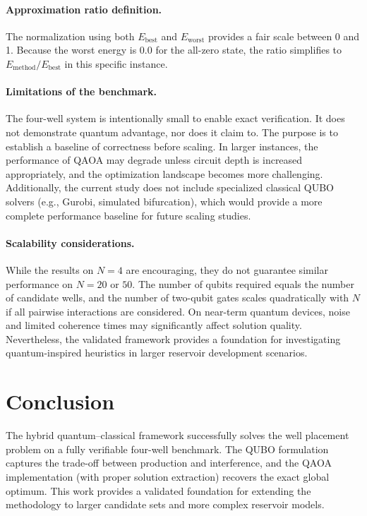 \documentclass[12pt]{article}
\begin{document}
\paragraph{Approximation ratio definition.}
The normalization using both \(E_{\text{best}}\) and \(E_{\text{worst}}\) provides a fair scale between 0 and 1. Because the worst energy is \(0.0\) for the all-zero state, the ratio simplifies to \(E_{\text{method}}/E_{\text{best}}\) in this specific instance.

\paragraph{Limitations of the benchmark.}
The four-well system is intentionally small to enable exact verification. It does not demonstrate quantum advantage, nor does it claim to. The purpose is to establish a baseline of correctness before scaling. In larger instances, the performance of QAOA may degrade unless circuit depth is increased appropriately, and the optimization landscape becomes more challenging. Additionally, the current study does not include specialized classical QUBO solvers (e.g., Gurobi, simulated bifurcation), which would provide a more complete performance baseline for future scaling studies.

\paragraph{Scalability considerations.}
While the results on \(N=4\) are encouraging, they do not guarantee similar performance on \(N=20\) or \(50\). The number of qubits required equals the number of candidate wells, and the number of two-qubit gates scales quadratically with \(N\) if all pairwise interactions are considered. On near-term quantum devices, noise and limited coherence times may significantly affect solution quality. Nevertheless, the validated framework provides a foundation for investigating quantum-inspired heuristics in larger reservoir development scenarios.

\section{Conclusion}

The hybrid quantum--classical framework successfully solves the well placement problem on a fully verifiable four-well benchmark. The QUBO formulation captures the trade-off between production and interference, and the QAOA implementation (with proper solution extraction) recovers the exact global optimum. This work provides a validated foundation for extending the methodology to larger candidate sets and more complex reservoir models.
\end{document}
